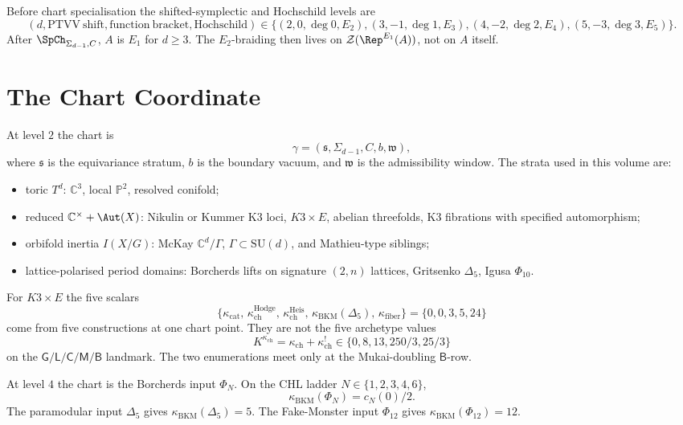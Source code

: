 Before chart specialisation the shifted-symplectic and Hochschild
levels are
\[
(d,\mathrm{PTVV\ shift},\mathrm{function\ bracket},\mathrm{Hochschild})
\in\{(2,0,\deg 0,E_2),(3,-1,\deg 1,E_3),(4,-2,\deg 2,E_4),(5,-3,\deg 3,E_5)\}.
\]
After \(\SpCh_{\Sigma_{d-1},C}\), \(A\) is \(E_1\) for \(d\geq3\).
The \(E_2\)-braiding then lives on \(\mathcal Z(\Rep^{E_1}(A))\), not
on \(A\) itself.

\section{The Chart Coordinate}
\label{sec:tas-horizontal}

At level \(2\) the chart is
\[
\gamma=(\mathfrak s,\Sigma_{d-1},C,b,\mathfrak w),
\]
where \(\mathfrak s\) is the equivariance stratum, \(b\) is the boundary
vacuum, and \(\mathfrak w\) is the admissibility window.  The strata used
in this volume are:
\begin{itemize}[nosep]
\item toric \(T^d\): \(\mathbb C^3\), local \(\mathbb P^2\), resolved
  conifold;
\item reduced \(\mathbb C^\times+\Aut(X)\): Nikulin or Kummer K3 loci,
  \(K3\times E\), abelian threefolds, K3 fibrations with specified
  automorphism;
\item orbifold inertia \(I(X/G)\): McKay \(\mathbb C^d/\Gamma\),
  \(\Gamma\subset\mathrm{SU}(d)\), and Mathieu-type siblings;
\item lattice-polarised period domains: Borcherds lifts on
  signature \((2,n)\) lattices, Gritsenko \(\Delta_5\), Igusa
  \(\Phi_{10}\).
\end{itemize}

For \(K3\times E\) the five scalars
\[
\bigl\{\kappa_{\mathrm{cat}},\,
\kappa_{\mathrm{ch}}^{\mathrm{Hodge}},\,
\kappa_{\mathrm{ch}}^{\mathrm{Heis}},\,
\kappa_{\mathrm{BKM}}(\Delta_5),\,
\kappa_{\mathrm{fiber}}\bigr\}
=\{0,0,3,5,24\}
\]
come from five constructions at one chart point.  They are not the five
archetype values
\[
K^{\kappa_{\mathrm{ch}}}
=\kappa_{\mathrm{ch}}+\kappa_{\mathrm{ch}}^!
\in\{0,8,13,250/3,25/3\}
\]
on the \(\mathsf G/\mathsf L/\mathsf C/\mathsf M/\mathsf B\) landmark.
The two enumerations meet only at the Mukai-doubling
\(\mathsf B\)-row.

At level \(4\) the chart is the Borcherds input \(\Phi_N\).  On the CHL
ladder \(N\in\{1,2,3,4,6\}\),
\[
\kappa_{\mathrm{BKM}}(\Phi_N)=c_N(0)/2 .
\]
The paramodular input \(\Delta_5\) gives
\(\kappa_{\mathrm{BKM}}(\Delta_5)=5\).  The Fake-Monster input
\(\Phi_{12}\) gives \(\kappa_{\mathrm{BKM}}(\Phi_{12})=12\).

